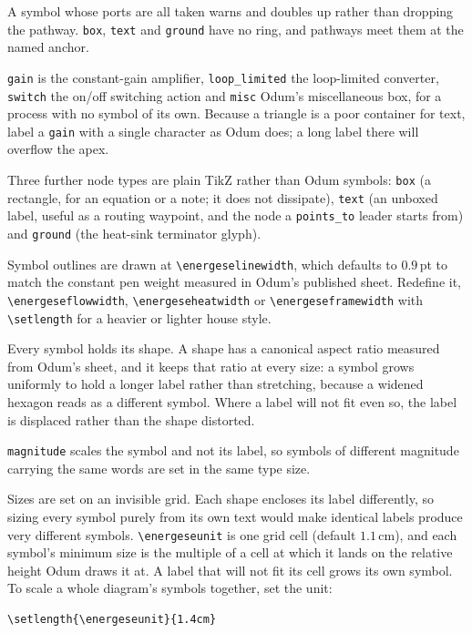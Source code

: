 \documentclass{article}
\begin{document}
\noindent A symbol whose ports are all taken warns and doubles up rather than
dropping the pathway. \texttt{box}, \texttt{text} and \texttt{ground} have no
ring, and pathways meet them at the named anchor.

\texttt{gain} is the constant-gain amplifier, \texttt{loop\_limited} the
loop-limited converter, \texttt{switch} the on/off switching action and
\texttt{misc} Odum's miscellaneous box, for a process with no symbol of its own.
Because a triangle is a poor container for text, label a \texttt{gain} with a
single character as Odum does; a long label there will overflow the apex.

Three further node types are plain TikZ rather than Odum symbols:
\texttt{box} (a rectangle, for an equation or a note; it does not dissipate),
\texttt{text} (an unboxed label, useful as a routing waypoint, and the node a
\texttt{points\_to} leader starts from) and \texttt{ground} (the heat-sink
terminator glyph).

Symbol outlines are drawn at \verb|\energeselinewidth|, which defaults to
$0.9$\,pt to match the constant pen weight measured in Odum's published sheet.
Redefine it, \verb|\energeseflowwidth|, \verb|\energeseheatwidth| or
\verb|\energeseframewidth| with \verb|\setlength| for a heavier or lighter house
style.

Every symbol holds its shape. A shape has a canonical aspect ratio measured from
Odum's sheet, and it keeps that ratio at every size: a symbol grows uniformly to
hold a longer label rather than stretching, because a widened hexagon reads as a
different symbol. Where a label will not fit even so, the label is displaced
rather than the shape distorted.

\texttt{magnitude} scales the symbol and not its label, so symbols of different
magnitude carrying the same words are set in the same type size.

Sizes are set on an invisible grid. Each shape encloses its label differently,
so sizing every symbol purely from its own text would make identical labels
produce very different symbols. \verb|\energeseunit| is one grid cell
(default $1.1$\,cm), and each symbol's minimum size is the multiple of a cell
at which it lands on the relative height Odum draws it at. A label that will not
fit its cell grows its own symbol. To scale a whole diagram's symbols together,
set the unit:

\begin{verbatim}
\setlength{\energeseunit}{1.4cm}
\end{verbatim}
\end{document}
